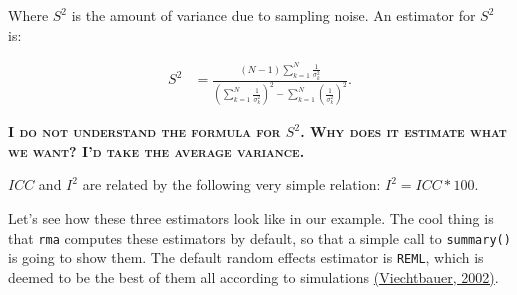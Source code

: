 \documentclass[]{book}
\newenvironment{Shaded}{\begin{snugshade}}{\end{snugshade}}
\newcommand{\KeywordTok}[1]{\textcolor[rgb]{0.13,0.29,0.53}{\textbf{#1}}}
\newcommand{\DataTypeTok}[1]{\textcolor[rgb]{0.13,0.29,0.53}{#1}}
\newcommand{\DecValTok}[1]{\textcolor[rgb]{0.00,0.00,0.81}{#1}}
\newcommand{\StringTok}[1]{\textcolor[rgb]{0.31,0.60,0.02}{#1}}
\newcommand{\CommentTok}[1]{\textcolor[rgb]{0.56,0.35,0.01}{\textit{#1}}}
\newcommand{\OperatorTok}[1]{\textcolor[rgb]{0.81,0.36,0.00}{\textbf{#1}}}
\newcommand{\NormalTok}[1]{#1}
\theoremstyle{definition}
\theoremstyle{definition}
\theoremstyle{definition}
\theoremstyle{remark}
\let\BeginKnitrBlock\begin \let\EndKnitrBlock\end
\begin{document}
Where \(S^2\) is the amount of variance due to sampling noise. An
estimator for \(S^2\) is:

\begin{align*}
  S^2 & = \frac{(N-1)\sum_{k=1}^N\frac{1}{\sigma^2_k}}{(\sum_{k=1}^N\frac{1}{\sigma^2_k})^2-\sum_{k=1}^N(\frac{1}{\sigma^2_k})^2}.
\end{align*}

\textbf{\textsc{I do not understand the formula for \(S^2\). Why does it
estimate what we want? I'd take the average variance.}}

\(ICC\) and \(I^2\) are related by the following very simple relation:
\(I^2=ICC*100\).

\BeginKnitrBlock{example}
\protect\hypertarget{exm:unnamed-chunk-152}{}{\label{exm:unnamed-chunk-152}
}Let's see how these three estimators look like in our example. The cool
thing is that \texttt{rma} computes these estimators by default, so that
a simple call to \texttt{summary()} is going to show them. The default
random effects estimator is \texttt{REML}, which is deemed to be the
best of them all according to simulations
\href{https://journals.sagepub.com/doi/abs/10.3102/10769986030003261}{(Viechtbauer,
2002)}.
\EndKnitrBlock{example}

\begin{Shaded}
\end{Shaded}
\end{document}
